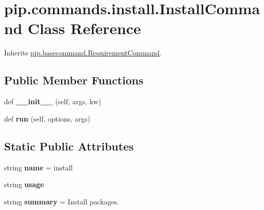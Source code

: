 \hypertarget{classpip_1_1commands_1_1install_1_1_install_command}{}\section{pip.\+commands.\+install.\+Install\+Command Class Reference}
\label{classpip_1_1commands_1_1install_1_1_install_command}


Inherits \hyperlink{classpip_1_1basecommand_1_1_requirement_command}{pip.\+basecommand.\+Requirement\+Command}.

\subsection*{Public Member Functions}
\begin{DoxyCompactItemize}
\item 
\mbox{\label{classpip_1_1commands_1_1install_1_1_install_command_aacdad79ade773b4ce2d504b5807da558}} 
def {\bfseries \+\_\+\+\_\+init\+\_\+\+\_\+} (self, args, kw)
\item 
\mbox{\label{classpip_1_1commands_1_1install_1_1_install_command_a4595f956b896b8cffa7e10a807c0553a}} 
def {\bfseries run} (self, options, args)
\end{DoxyCompactItemize}
\subsection*{Static Public Attributes}
\begin{DoxyCompactItemize}
\item 
\mbox{\label{classpip_1_1commands_1_1install_1_1_install_command_a37fd13869af16262161d5ff98d3cb343}} 
string {\bfseries name} = \textquotesingle{}install\textquotesingle{}
\item 
string {\bfseries usage}
\item 
\mbox{\label{classpip_1_1commands_1_1install_1_1_install_command_a1aed68f944f873e477e5eb71ca96db93}} 
string {\bfseries summary} = \textquotesingle{}Install packages.\textquotesingle{}
\end{DoxyCompactItemize}
